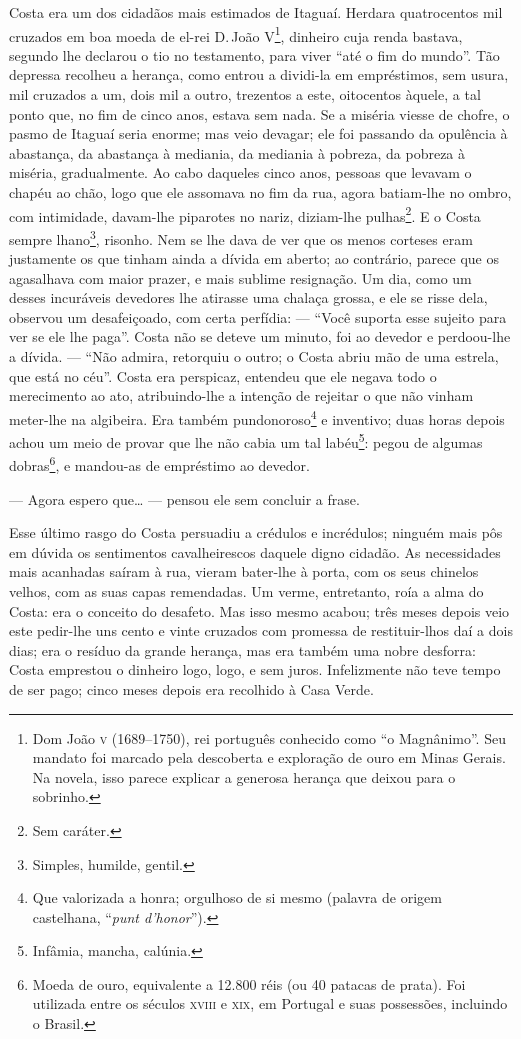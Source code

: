 Costa era um dos cidadãos mais estimados de Itaguaí. Herdara
quatrocentos mil cruzados em boa moeda de el-rei D.\,João \textsc{V}\footnote{Dom
  João \textsc{v} (1689--1750), rei português conhecido como ``o Magnânimo''. Seu
  mandato foi marcado pela descoberta e exploração de ouro em Minas
  Gerais. Na novela, isso parece explicar a generosa herança que deixou
  para o sobrinho.}, dinheiro cuja renda bastava, segundo lhe declarou o
tio no testamento, para viver ``até o fim do mundo''. Tão depressa
recolheu a herança, como entrou a dividi-la em empréstimos, sem usura,
mil cruzados a um, dois mil a outro, trezentos a este, oitocentos
àquele, a tal ponto que, no fim de cinco anos, estava sem nada. Se a
miséria viesse de chofre, o pasmo de Itaguaí seria enorme; mas veio
devagar; ele foi passando da opulência à abastança, da abastança à
mediania, da mediania à pobreza, da pobreza à miséria, gradualmente. Ao
cabo daqueles cinco anos, pessoas que levavam o chapéu ao chão, logo que
ele assomava no fim da rua, agora batiam-lhe no ombro, com intimidade,
davam-lhe piparotes no nariz, diziam-lhe pulhas\footnote{Sem caráter.}.
E o Costa sempre lhano\footnote{Simples, humilde, gentil.}, risonho. Nem
se lhe dava de ver que os menos corteses eram justamente os que tinham
ainda a dívida em aberto; ao contrário, parece que os agasalhava com
maior prazer, e mais sublime resignação. Um dia, como um desses
incuráveis devedores lhe atirasse uma chalaça grossa, e ele se risse
dela, observou um desafeiçoado, com certa perfídia: --- ``Você suporta
esse sujeito para ver se ele lhe paga''. Costa não se deteve um minuto,
foi ao devedor e perdoou-lhe a dívida. --- ``Não admira, retorquiu o
outro; o Costa abriu mão de uma estrela, que está no céu''. Costa era
perspicaz, entendeu que ele negava todo o merecimento ao ato,
atribuindo-lhe a intenção de rejeitar o que não vinham meter-lhe na
algibeira. Era também pundonoroso\footnote{Que valorizada a honra;
  orgulhoso de si mesmo (palavra de origem castelhana, ``\emph{punt
  d'honor}'').} e inventivo; duas horas depois achou um meio de provar
que lhe não cabia um tal labéu\footnote{Infâmia, mancha, calúnia.}:
pegou de algumas dobras\footnote{Moeda de ouro, equivalente a 12.800
  réis (ou 40 patacas de prata). Foi utilizada entre os séculos \textsc{xviii} e
  \textsc{xix}, em Portugal e suas possessões, incluindo o Brasil.}, e mandou-as
de empréstimo ao devedor.

--- Agora espero que\ldots{} --- pensou ele sem concluir a frase.

Esse último rasgo do Costa persuadiu a crédulos e incrédulos; ninguém
mais pôs em dúvida os sentimentos cavalheirescos daquele digno cidadão.
As necessidades mais acanhadas saíram à rua, vieram bater-lhe à porta,
com os seus chinelos velhos, com as suas capas remendadas. Um verme,
entretanto, roía a alma do Costa: era o conceito do desafeto. Mas isso
mesmo acabou; três meses depois veio este pedir-lhe uns cento e vinte
cruzados com promessa de restituir-lhos daí a dois dias; era o resíduo
da grande herança, mas era também uma nobre desforra: Costa emprestou o
dinheiro logo, logo, e sem juros. Infelizmente não teve tempo de ser
pago; cinco meses depois era recolhido à Casa Verde.

